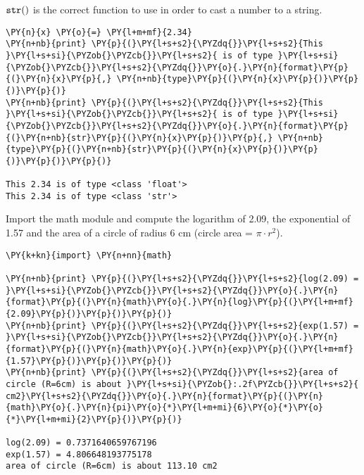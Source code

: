\begin{Answer}
\(\tt{str()}\) is the correct function to use in order to cast a number
to a string.

\begin{codebox}[size=fbox, boxrule=1pt, colback=cellbackground, colframe=cellborder]
\begin{Verbatim}[commandchars=\\\{\}]
\PY{n}{x} \PY{o}{=} \PY{l+m+mf}{2.34}
\PY{n+nb}{print} \PY{p}{(}\PY{l+s+s2}{\PYZdq{}}\PY{l+s+s2}{This }\PY{l+s+si}{\PYZob{}\PYZcb{}}\PY{l+s+s2}{ is of type }\PY{l+s+si}{\PYZob{}\PYZcb{}}\PY{l+s+s2}{\PYZdq{}}\PY{o}{.}\PY{n}{format}\PY{p}{(}\PY{n}{x}\PY{p}{,} \PY{n+nb}{type}\PY{p}{(}\PY{n}{x}\PY{p}{)}\PY{p}{)}\PY{p}{)}
\PY{n+nb}{print} \PY{p}{(}\PY{l+s+s2}{\PYZdq{}}\PY{l+s+s2}{This }\PY{l+s+si}{\PYZob{}\PYZcb{}}\PY{l+s+s2}{ is of type }\PY{l+s+si}{\PYZob{}\PYZcb{}}\PY{l+s+s2}{\PYZdq{}}\PY{o}{.}\PY{n}{format}\PY{p}{(}\PY{n+nb}{str}\PY{p}{(}\PY{n}{x}\PY{p}{)}\PY{p}{,} \PY{n+nb}{type}\PY{p}{(}\PY{n+nb}{str}\PY{p}{(}\PY{n}{x}\PY{p}{)}\PY{p}{)}\PY{p}{)}\PY{p}{)}

This 2.34 is of type <class 'float'>
This 2.34 is of type <class 'str'>
\end{Verbatim}
\end{codebox}  
\end{Answer}

\begin{Exercise}
Import the math module and compute the logarithm of 2.09, the exponential of 1.57 and the area of a circle of radius 6 cm (circle area = $\pi \cdot r^2$).
\end{Exercise}

\begin{Answer}
\begin{codebox}[size=fbox, boxrule=1pt, colback=cellbackground, colframe=cellborder]
\begin{Verbatim}[commandchars=\\\{\}]
\PY{k+kn}{import} \PY{n+nn}{math}

\PY{n+nb}{print} \PY{p}{(}\PY{l+s+s2}{\PYZdq{}}\PY{l+s+s2}{log(2.09) = }\PY{l+s+si}{\PYZob{}\PYZcb{}}\PY{l+s+s2}{\PYZdq{}}\PY{o}{.}\PY{n}{format}\PY{p}{(}\PY{n}{math}\PY{o}{.}\PY{n}{log}\PY{p}{(}\PY{l+m+mf}{2.09}\PY{p}{)}\PY{p}{)}\PY{p}{)}
\PY{n+nb}{print} \PY{p}{(}\PY{l+s+s2}{\PYZdq{}}\PY{l+s+s2}{exp(1.57) = }\PY{l+s+si}{\PYZob{}\PYZcb{}}\PY{l+s+s2}{\PYZdq{}}\PY{o}{.}\PY{n}{format}\PY{p}{(}\PY{n}{math}\PY{o}{.}\PY{n}{exp}\PY{p}{(}\PY{l+m+mf}{1.57}\PY{p}{)}\PY{p}{)}\PY{p}{)}
\PY{n+nb}{print} \PY{p}{(}\PY{l+s+s2}{\PYZdq{}}\PY{l+s+s2}{area of circle (R=6cm) is about }\PY{l+s+si}{\PYZob{}:.2f\PYZcb{}}\PY{l+s+s2}{ cm2}\PY{l+s+s2}{\PYZdq{}}\PY{o}{.}\PY{n}{format}\PY{p}{(}\PY{n}{math}\PY{o}{.}\PY{n}{pi}\PY{o}{*}\PY{l+m+mi}{6}\PY{o}{*}\PY{o}{*}\PY{l+m+mi}{2}\PY{p}{)}\PY{p}{)}

log(2.09) = 0.7371640659767196
exp(1.57) = 4.806648193775178
area of circle (R=6cm) is about 113.10 cm2
\end{Verbatim}
\end{codebox}
\end{Answer}

